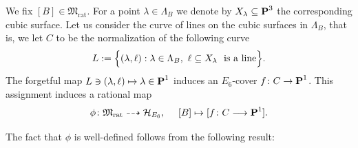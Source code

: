 \documentclass[11pt]{amsart}
\theoremstyle{definition}
\def\PP{{\textbf P}}
\def\cH{\mathcal{H}}
\begin{document}
\vskip 4pt


We fix $[B]\in \mathfrak{M}_{\mathrm{rat}}$. For a point $\lambda\in \Lambda_B$  we denote by $X_{\lambda}\subseteq \PP^3$ the corresponding cubic surface. Let us consider the curve of lines on the cubic surfaces in $\Lambda_B$, that is, we let $C$ to be the normalization of the following curve
$$L:=\Bigl\{(\lambda, \ell): \lambda\in \Lambda_B, \  \ell\subseteq X_{\lambda} \  \mbox{ is a line}\Bigr\}.$$
The forgetful map $L\ni (\lambda,\ell)\mapsto \lambda \in \PP^1$ induces an $E_6$-cover $f\colon C\rightarrow \PP^1$. This assignment induces a rational map 
\begin{equation}\label{eq:Hurw_par}
\phi\colon \mathfrak{M}_{\mathrm{rat}}\dashrightarrow \cH_{E_6}, \ \ \ \ [B]\mapsto [f\colon C\longrightarrow \PP^1].
\end{equation}

\vskip 4pt


The fact that $\phi$ is well-defined follows from the following result:
\end{document}
